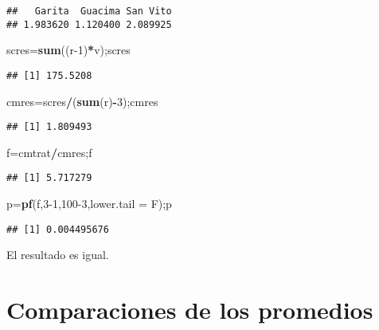 \documentclass[
]{article}
\newenvironment{Shaded}{\begin{snugshade}}{\end{snugshade}}
\newcommand{\AttributeTok}[1]{\textcolor[rgb]{0.13,0.29,0.53}{#1}}
\newcommand{\DecValTok}[1]{\textcolor[rgb]{0.00,0.00,0.81}{#1}}
\newcommand{\FunctionTok}[1]{\textcolor[rgb]{0.13,0.29,0.53}{\textbf{#1}}}
\newcommand{\NormalTok}[1]{#1}
\newcommand{\OtherTok}[1]{\textcolor[rgb]{0.56,0.35,0.01}{#1}}
\newcommand{\SpecialCharTok}[1]{\textcolor[rgb]{0.81,0.36,0.00}{\textbf{#1}}}
\begin{document}
\begin{verbatim}
##   Garita  Guacima San Vito 
## 1.983620 1.120400 2.089925
\end{verbatim}

\begin{Shaded}
\begin{Highlighting}[]
\NormalTok{scres}\OtherTok{=}\FunctionTok{sum}\NormalTok{((r}\DecValTok{{-}1}\NormalTok{)}\SpecialCharTok{*}\NormalTok{v);scres}
\end{Highlighting}
\end{Shaded}

\begin{verbatim}
## [1] 175.5208
\end{verbatim}

\begin{Shaded}
\begin{Highlighting}[]
\NormalTok{cmres}\OtherTok{=}\NormalTok{scres}\SpecialCharTok{/}\NormalTok{(}\FunctionTok{sum}\NormalTok{(r)}\SpecialCharTok{{-}}\DecValTok{3}\NormalTok{);cmres}
\end{Highlighting}
\end{Shaded}

\begin{verbatim}
## [1] 1.809493
\end{verbatim}

\begin{Shaded}
\begin{Highlighting}[]
\NormalTok{f}\OtherTok{=}\NormalTok{cmtrat}\SpecialCharTok{/}\NormalTok{cmres;f}
\end{Highlighting}
\end{Shaded}

\begin{verbatim}
## [1] 5.717279
\end{verbatim}

\begin{Shaded}
\begin{Highlighting}[]
\NormalTok{p}\OtherTok{=}\FunctionTok{pf}\NormalTok{(f,}\DecValTok{3{-}1}\NormalTok{,}\DecValTok{100{-}3}\NormalTok{,}\AttributeTok{lower.tail =}\NormalTok{ F);p}
\end{Highlighting}
\end{Shaded}

\begin{verbatim}
## [1] 0.004495676
\end{verbatim}

El resultado es igual.

\hypertarget{comparaciones-de-los-promedios}{%
\section{Comparaciones de los
promedios}\label{comparaciones-de-los-promedios}}
\end{document}
